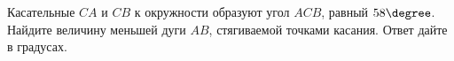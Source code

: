 \begin{ex}
	\begin{condition}
		Касательные \( CA \)  и \( CB \)  к окружности образуют угол \( ACB \), равный \( 58 \degree\). Найдите величину меньшей дуги \( AB \), стягиваемой точками касания. Ответ дайте в градусах.
	\end{condition}
\end{ex}